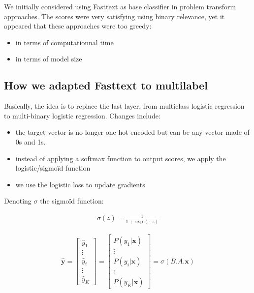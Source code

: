We initially considered using Fasttext as base classifier in problem transform approaches. The scores were very satisfying using binary relevance, yet it appeared that these approaches were too greedy:
\begin{itemize}
	\item in terms of computationnal time
	\item in terms of model size
\end{itemize}

\subsection{How we adapted Fasttext to multilabel}

Basically, the idea is to replace the last layer, from multiclass logistic regression to multi-binary logistic regression. Changes include:

\begin{itemize}
	\item the target vector is no longer one-hot encoded but can be any vector made of 0s and 1s.
	\item instead of applying a softmax function to output scores, we apply the logistic/sigmoïd function
	\item we use the logistic loss to update gradients
\end{itemize}


Denoting $\sigma$ the sigmoïd function:

\begin{align}
	\sigma(z) = \frac{1}{1 + \exp(-z)}
\end{align}

\begin{align}
 \mathbf{\hat y}
 	= \begin{bmatrix} 
		\hat y_1 \\
		\vdots \\
		\hat y_i\\
		\vdots \\
		\hat y_K
	\end{bmatrix}
	 = \begin{bmatrix} 
		P(y_1 | \mathbf{x}) \\
		\vdots \\
		P(y_i | \mathbf{x})\\
		\vdots \\
		P(y_K | \mathbf{x})
	\end{bmatrix} = 
	\sigma(B.A.\mathbf{x})
\end{align}

